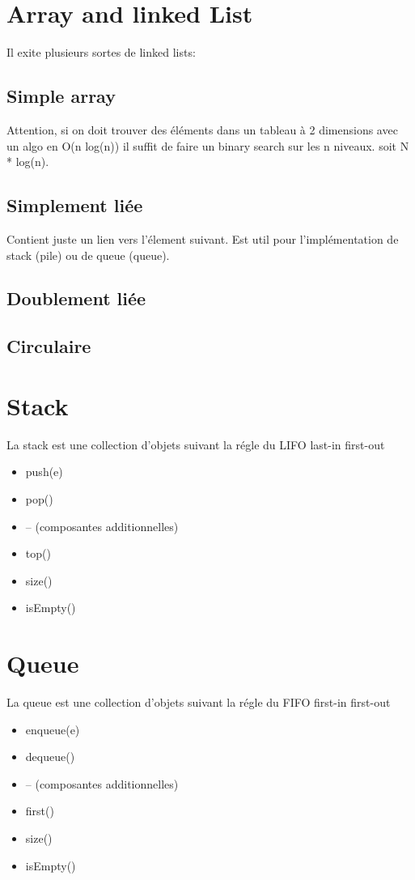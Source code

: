 \documentclass[a4paper]{article}
\begin{document}
\section{Array and linked List}

Il exite plusieurs sortes de linked lists:

\subsection{Simple array}
Attention, si on doit trouver des éléments dans un tableau à 2 dimensions avec un algo en O(n log(n)) il suffit de faire un binary search sur les n niveaux. soit N * log(n).

\subsection{Simplement liée}
Contient juste un lien vers l'élement suivant.
Est util pour l'implémentation de stack (pile) ou de queue (queue).
\subsection{Doublement liée}
\subsection{Circulaire}


\section{Stack}
La stack est une collection d'objets suivant la régle du LIFO
last-in first-out

\begin{itemize}
\item push(e)
\item pop()
\item  -- (composantes additionnelles)
\item top()
\item size()
\item isEmpty()
\end{itemize}
\section{Queue}
La queue est une collection d'objets suivant la régle du FIFO
first-in first-out

\begin{itemize}
\item enqueue(e)
\item dequeue()
\item  -- (composantes additionnelles)
\item  first()
\item  size()
\item  isEmpty()
\end{itemize}
\end{document}

